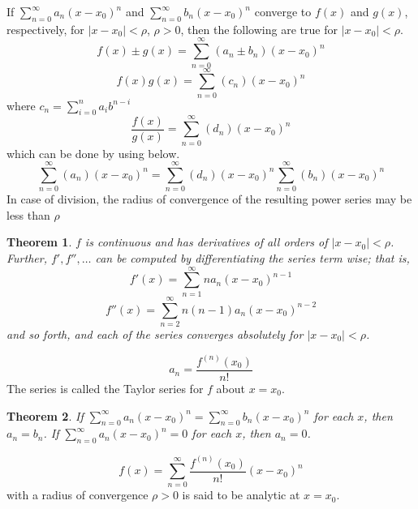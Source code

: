 \documentclass[letter]{article}
\newtheorem{theorem}{Theorem}[section]
\newenvironment{definition}[1][Definition]{\begin{trivlist}
\item[\hskip \labelsep {\bfseries #1}]}{\end{trivlist}}
\begin{document}
If  $\sum_{n=0}^{\infty} a_n(x-x_0)^n$ and  $\sum_{n=0}^{\infty} b_n(x-x_0)^n$ converge to $f(x)$ and $g(x)$, respectively, for $|x-x_0|<\rho$, $\rho>0$, then the following are true for $|x-x_0|<\rho$.
\[
f(x) \pm g(x) = \sum_{n=0}^{\infty} (a_n\pm b_n)(x-x_0)^n
\]
\[
f(x)g(x) = \sum_{n=0}^{\infty} (c_n)(x-x_0)^n
\]
where $c_n = \sum_{i=0}^n a_i b^{n-i}$
\[
\frac{f(x)}{g(x)} = \sum_{n=0}^{\infty} (d_n)(x-x_0)^n
\]
which can be done by using below.
\[
\sum_{n=0}^{\infty} (a_n)(x-x_0)^n = \sum_{n=0}^{\infty} (d_n)(x-x_0)^n\sum_{n=0}^{\infty} (b_n)(x-x_0)^n
\]
In case of division, the radius of convergence of the resulting power series may be less than $\rho$

\begin{theorem}
$f$ is continuous and has derivatives of all orders of $|x-x_0|<\rho$. Further, $f',f'',\ldots$ can be computed by differentiating the series term wise; that is,
\[f'(x) = \sum_{n=1}^\infty n a_n (x-x_0)^{n-1}\]
\[f''(x) = \sum_{n=2}^\infty n(n-1) a_n (x-x_0)^{n-2}\]
and so forth, and each of the series converges absolutely for $|x-x_0|<\rho$.
\end{theorem}

\begin{definition}
\[ a_n = \frac{f^{(n)}(x_0)}{n!} \]
The series is called the Taylor series for $f$ about $x=x_0$.
\end{definition}

\begin{theorem}
If $\sum_{n=0}^\infty a_n(x-x_0)^n = \sum_{n=0}^\infty b_n(x-x_0)^n$ for each $x$, then $a_n = b_n$. If $\sum_{n=0}^\infty a_n(x-x_0)^n = 0$ for each $x$, then $a_n = 0$.
\end{theorem}

\begin{definition}
\[
f(x) = \sum_{n=0}^\infty \frac{f^{(n)}(x_0)}{n!}(x-x_0)^n
\]
with a radius of convergence $\rho > 0$ is said to be analytic at $x=x_0$.
\end{definition}
\end{document}
